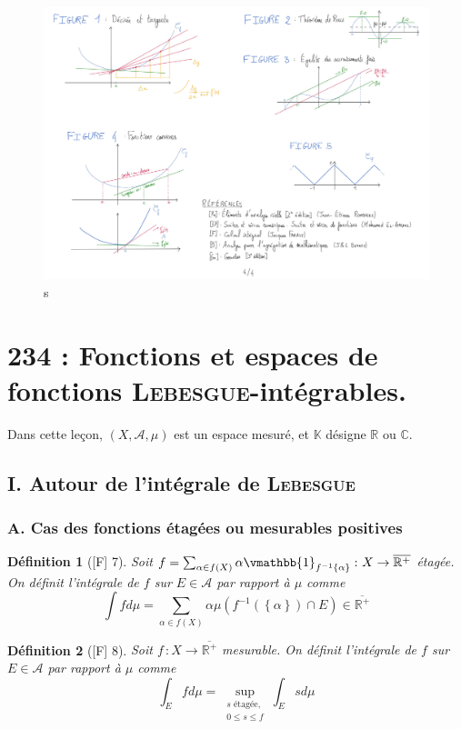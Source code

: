 \documentclass[10pt, a4paper, parskip=full, twoside, twocolumn]{report}
\newtheorem{definition}{Définition}
\newcommand{\IK}{\mathbb{K}}
\newcommand{\IC}{\mathbb{C}}
\newcommand{\IR}{\mathbb{R}}
\newcommand{\A}{\mathscr{A}}
\begin{document}
\begin{figure}[!htb]
	\centering
	\includegraphics[trim={0 0 0 0},clip,width=1\linewidth]{img/228.pdf}
	\caption{s}
\end{figure}


\chapter*{234 : Fonctions et espaces de fonctions \textsc{Lebesgue}-intégrables.}
\setcounter{definition}{0}
\textcolor{paragraphtext}{Dans cette leçon, $(X,\A,\mu)$ est un espace mesuré, et $\IK$ désigne $\IR$ ou $\IC$.}

\section*{I. Autour de l'intégrale de \textsc{Lebesgue}}
\subsection*{A. Cas des fonctions étagées ou mesurables positives}

\begin{definition}[\textnormal{[F] 7}]
	Soit $f=\sum_{\alpha\in f(X)} \alpha \vmathbb{1}_{f^{-1}{\left\{\alpha\right\}}}\,\colon X\to \overline{\IR^+}$ étagée.
	On définit l'\emph{intégrale de $f$ sur $E\in \A$ par rapport à $\mu$} comme
	$$\int fd\mu = \sum_{\alpha\in f(X)} \alpha \mu\left(f^{-1}(\left\{\alpha\right\})\cap E\right)\in \overline{\IR^+}$$
\end{definition}
\begin{definition}[\textnormal{[F] 8}]
	Soit $f\,\colon X\to \overline{\IR^+}$ mesurable. On définit \emph{l'intégrale de $f$ sur $E\in \A$ par rapport à $\mu$} comme 
	$$\int_E fd\mu = \sup_{\substack{s\text{ étagée},\\0\leq s\leq f}} \int_E sd\mu$$
\end{definition}
\end{document}

